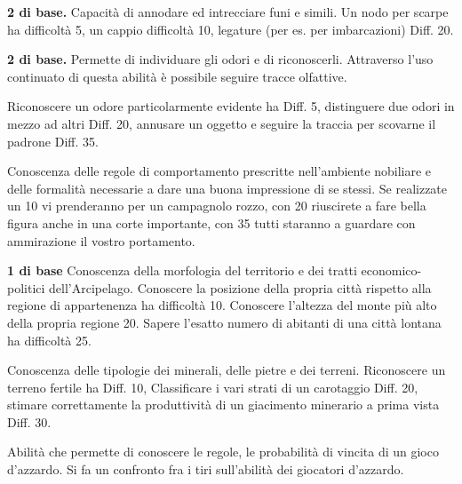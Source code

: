 
 \textbf{2 di base.} Capacit\`a di annodare ed
intrecciare funi e simili. Un nodo per scarpe ha difficolt\`a 5, un
cappio difficolt\`a 10, legature (per es. per imbarcazioni) Diff.  20.

 \textbf{2 di base.} Permette di individuare gli
odori e di riconoscerli. Attraverso l'uso continuato di questa
abilit\`a \`e possibile seguire tracce olfattive.

Riconoscere un odore particolarmente evidente ha Diff. 5, distinguere
due odori in mezzo ad altri Diff. 20, annusare un oggetto e seguire la
traccia per scovarne il padrone Diff. 35.

\iffullversion
{} Conoscenza delle regole di comportamento prescritte nell'ambiente
nobiliare e delle formalit\`a necessarie a dare una buona
impressione di se stessi. Se realizzate un 10 vi prenderanno per un
campagnolo rozzo, con 20 riuscirete a fare bella figura anche in una
corte importante, con 35 tutti staranno a guardare con ammirazione il
vostro portamento.
\fi

 \textbf{1 di base} Conoscenza della morfologia
del territorio e dei tratti economico-politici dell'Arcipelago.
Conoscere la posizione della propria citt\`a rispetto alla regione di
appartenenza ha difficolt\`a 10. Conoscere l'altezza del monte pi\`u
alto della propria regione 20. Sapere l'esatto numero di abitanti di
una citt\`a lontana ha difficolt\`a 25.

\iffullversion {} Conoscenza delle tipologie dei
minerali, delle pietre e dei terreni. Riconoscere un terreno fertile
ha Diff. 10, Classificare i vari strati di un carotaggio Diff. 20,
stimare correttamente la produttivit\`a di un giacimento minerario a
prima vista Diff. 30.

 Abilit\`a che permette di
conoscere le regole, le probabilit\`a di vincita di un gioco
d'azzardo.  Si fa un confronto fra i tiri sull'abilit\`a dei
giocatori d'azzardo.


